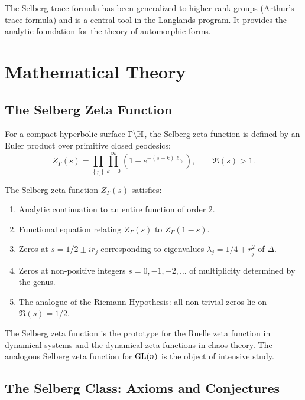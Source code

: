 The Selberg trace formula has been generalized to higher rank groups (Arthur's trace formula) and is a central tool in the Langlands program. It provides the analytic foundation for the theory of automorphic forms.

\section{Mathematical Theory}

\subsection{The Selberg Zeta Function}

For a compact hyperbolic surface \(\Gamma \backslash \mathbb{H}\), the Selberg zeta function is defined by an Euler product over primitive closed geodesics:
\[
Z_\Gamma(s) = \prod_{\{\gamma_0\}} \prod_{k=0}^{\infty} \left(1 - e^{-(s+k)\ell_{\gamma_0}}\right), \qquad \Re(s) > 1.
\]

\begin{theorem}
The Selberg zeta function \(Z_\Gamma(s)\) satisfies:
\begin{enumerate}
    \item Analytic continuation to an entire function of order 2.
    \item Functional equation relating \(Z_\Gamma(s)\) to \(Z_\Gamma(1-s)\).
    \item Zeros at \(s = 1/2 \pm i r_j\) corresponding to eigenvalues \(\lambda_j = 1/4 + r_j^2\) of \(\Delta\).
    \item Zeros at non-positive integers \(s = 0, -1, -2, \ldots\) of multiplicity determined by the genus.
    \item The analogue of the Riemann Hypothesis: all non-trivial zeros lie on \(\Re(s) = 1/2\).
\end{enumerate}
\end{theorem}

The Selberg zeta function is the prototype for the Ruelle zeta function in dynamical systems and the dynamical zeta functions in chaos theory. The analogous Selberg zeta function for \(\operatorname{GL}(n)\) is the object of intensive study.

\subsection{The Selberg Class: Axioms and Conjectures}

